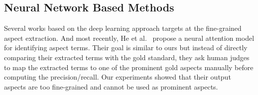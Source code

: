 \subsection{Neural Network Based Methods}
Several works \cite{poria2016aspect, DBLP:journals/corr/WangPDX16} 
based on the deep learning approach targets at the fine-grained aspect extraction.
And most recently, He et al.~\cite{DBLP:conf/acl/HeLND17}  propose a neural attention model 
for identifying aspect terms. Their goal is similar to ours but instead of
directly comparing their extracted terms with the gold standard, they ask
human judges to map the extracted terms to one of the prominent gold 
aspects manually before computing the precision/recall. 
Our experiments showed that their output aspects are too fine-grained and 
cannot be used as prominent aspects.
%

